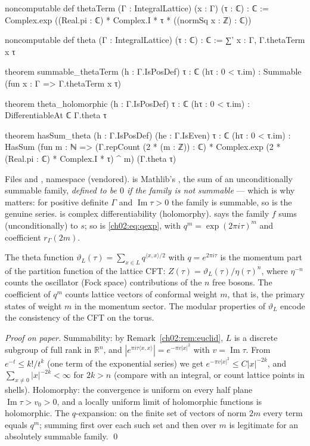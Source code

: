 \begin{leancode}
noncomputable def thetaTerm (Γ : IntegralLattice) (x : Γ) (τ : ℂ) : ℂ :=
  Complex.exp ((Real.pi : ℂ) * Complex.I * τ * ((normSq x : ℤ) : ℂ))

noncomputable def theta (Γ : IntegralLattice) (τ : ℂ) : ℂ := ∑' x : Γ, Γ.thetaTerm x τ

theorem summable_thetaTerm (h : Γ.IsPosDef) {τ : ℂ} (hτ : 0 < τ.im) :
    Summable (fun x : Γ => Γ.thetaTerm x τ)

theorem theta_holomorphic (h : Γ.IsPosDef) {τ : ℂ} (hτ : 0 < τ.im) :
    DifferentiableAt ℂ Γ.theta τ

theorem hasSum_theta (h : Γ.IsPosDef) (he : Γ.IsEven) {τ : ℂ} (hτ : 0 < τ.im) :
    HasSum (fun m : ℕ =>
        (Γ.repCount (2 * (m : ℤ)) : ℂ) * Complex.exp (2 * (Real.pi : ℂ) * Complex.I * τ) ^ m)
      (Γ.theta τ)
\end{leancode}
\begin{dictionary}
Files  and , namespace
 (vendored).   is Mathlib's , the sum of an
unconditionally summable family, \emph{defined to be $0$ if the family is not summable} --- which
is why  matters: for positive definite $\Gamma$ and $\operatorname{Im}\tau>0$
the family is summable, so  is the genuine series.   is
complex differentiability (holomorphy).   says the family $f$ sums
(unconditionally) to $s$; so  is \eqref{ch02:eq:qexp}, with
$q^m=\exp(2\pi i\tau)^m$ and coefficient $r_\Gamma(2m)$.
\end{dictionary}
\begin{physics}
The theta function $\vartheta_L(\tau)=\sum_{x\in L}q^{\langle x,x\rangle/2}$ with $q=e^{2\pi i\tau}$ is the momentum part of the partition function of the lattice CFT: $Z(\tau)=\vartheta_L(\tau)/\eta(\tau)^n$, where $\eta^{-n}$ counts the oscillator (Fock space) contributions of the $n$ free bosons. The coefficient of $q^m$ counts lattice vectors of conformal weight $m$, that is, the primary states of weight $m$ in the momentum sector. The modular properties of $\vartheta_L$ encode the consistency of the CFT on the torus.
\end{physics}
\emph{Proof on paper.}  Summability: by Remark~\ref{ch02:rem:euclid}, $L$ is a discrete subgroup of
full rank in $\mathbb{R}^n$, and $|e^{\pi i\tau\langle x,x\rangle}|=e^{-\pi v|x|^2}$ with
$v=\operatorname{Im}\tau$.  From $e^{-t}\le k!/t^k$ (one term of the exponential series) we get
$e^{-\pi v|x|^2}\le C|x|^{-2k}$, and $\sum_{x\ne0}|x|^{-2k}<\infty$ for $2k>n$ (compare with an
integral, or count lattice points in shells).  Holomorphy: the convergence is uniform on every
half plane $\operatorname{Im}\tau>v_0>0$, and a locally uniform limit of holomorphic functions is
holomorphic.  The $q$-expansion: on the finite set of vectors of norm $2m$ every term equals
$q^m$; summing first over each such set and then over $m$ is legitimate for an absolutely
summable family.  \qed


